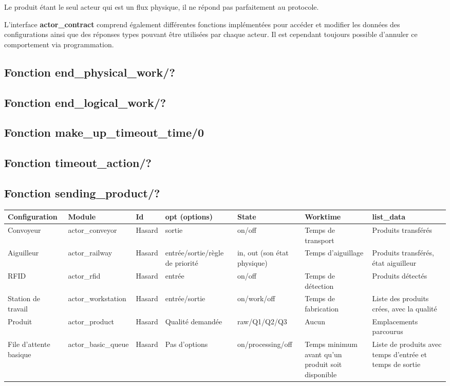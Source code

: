 \documentclass[12pt,a4paper]{article}
\begin{document}
		 Le produit étant le seul acteur qui est un flux physique, 
		 il ne répond pas parfaitement au protocole. 
		 
		 L'interface \textbf{actor\_contract} comprend également différentes 
		 fonctions implémentées pour accéder et modifier les données des 
		 configurations ainsi que des réponses types pouvant être utilisées 
		 par chaque acteur. Il est cependant toujours possible d'annuler ce 
		 comportement via programmation.

	\subsection*{Fonction end\_physical\_work/?}
	\subsection*{Fonction end\_logical\_work/?}
	\subsection*{Fonction make\_up\_timeout\_time/0}
	\subsection*{Fonction timeout\_action/?}
	\subsection*{Fonction sending\_product/?}
	 
	\begin{landscape}
		\begin{center}
			\begin{tabularx}{1.55\textwidth}{|X|X|X|X|X|X|X|}
				\hline
				Configuration & Module & Id & opt (options) & State & Worktime & list\_data \\
				\hline
				Convoyeur & actor\_conveyor & Hasard & sortie & on/off & Temps de transport & Produits transférés \\
				\hline
				Aiguilleur & actor\_railway & Hasard & entrée/sortie/règle de priorité & {in, out} (son état physique) & Temps d'aiguillage & Produits transférés, état aiguilleur \\
				\hline
				RFID & actor\_rfid & Hasard & entrée & on/off & Temps de détection & Produits détectés\\
				\hline
				Station de travail & actor\_workstation & Hasard & entrée/sortie & on/work/off & Temps de fabrication & Liste des produits crées, avec la qualité \\
				\hline
				Produit & actor\_product & Hasard & Qualité demandée & raw/Q1/Q2/Q3 & Aucun & Emplacements parcourus \\
				\hline
				File d'attente basique & actor\_basic\_queue & Hasard & Pas d'options & on/processing/off & Temps minimum avant qu'un produit soit disponible & Liste de produits avec temps d'entrée et temps de sortie \\
				\hline
			\end{tabularx}
		\end{center}
	
	\end{landscape}
\end{document}
